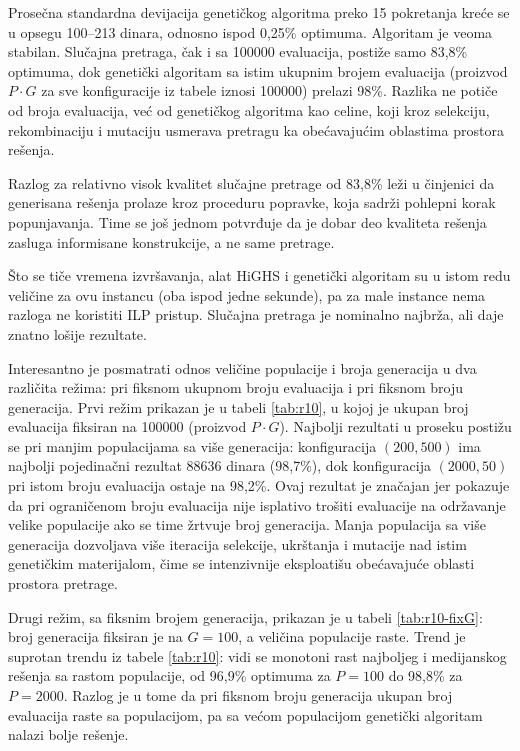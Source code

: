 \documentclass[12pt]{article}
\begin{document}
Prosečna standardna devijacija genetičkog algoritma preko 15 pokretanja kreće se u opsegu 100--213 dinara, odnosno ispod 0,25\% optimuma. Algoritam je veoma stabilan. Slučajna pretraga, čak i sa 100000 evaluacija, postiže samo 83,8\% optimuma, dok genetički algoritam sa istim ukupnim brojem evaluacija (proizvod $P \cdot G$ za sve konfiguracije iz tabele iznosi 100000) prelazi 98\%. Razlika ne potiče od broja evaluacija, već od genetičkog algoritma kao celine, koji kroz selekciju, rekombinaciju i mutaciju usmerava pretragu ka obećavajućim oblastima prostora rešenja.

Razlog za relativno visok kvalitet slučajne pretrage od 83,8\% leži u činjenici da generisana rešenja prolaze kroz proceduru popravke, koja sadrži pohlepni korak popunjavanja. Time se još jednom potvrđuje da je dobar deo kvaliteta rešenja zasluga informisane konstrukcije, a ne same pretrage.

Što se tiče vremena izvršavanja, alat HiGHS i genetički algoritam su u istom redu veličine za ovu instancu (oba ispod jedne sekunde), pa za male instance nema razloga ne koristiti ILP pristup. Slučajna pretraga je nominalno najbrža, ali daje znatno lošije rezultate.

Interesantno je posmatrati odnos veličine populacije i broja generacija u dva različita režima: pri fiksnom ukupnom broju evaluacija i pri fiksnom broju generacija. Prvi režim prikazan je u tabeli \ref{tab:r10}, u kojoj je ukupan broj evaluacija fiksiran na 100000 (proizvod $P \cdot G$). Najbolji rezultati u proseku postižu se pri manjim populacijama sa više generacija: konfiguracija $(200, 500)$ ima najbolji pojedinačni rezultat 88636 dinara (98,7\%), dok konfiguracija $(2000, 50)$ pri istom broju evaluacija ostaje na 98,2\%. Ovaj rezultat je značajan jer pokazuje da pri ograničenom broju evaluacija nije isplativo trošiti evaluacije na održavanje velike populacije ako se time žrtvuje broj generacija. Manja populacija sa više generacija dozvoljava više iteracija selekcije, ukrštanja i mutacije nad istim genetičkim materijalom, čime se intenzivnije eksploatišu obećavajuće oblasti prostora pretrage.

Drugi režim, sa fiksnim brojem generacija, prikazan je u tabeli \ref{tab:r10-fixG}: broj generacija fiksiran je na $G = 100$, a veličina populacije raste. Trend je suprotan trendu iz tabele \ref{tab:r10}: vidi se monotoni rast najboljeg i medijanskog rešenja sa rastom populacije, od 96,9\% optimuma za $P = 100$ do 98,8\% za $P = 2000$. Razlog je u tome da pri fiksnom broju generacija ukupan broj evaluacija raste sa populacijom, pa sa većom populacijom genetički algoritam nalazi bolje rešenje.
\end{document}
